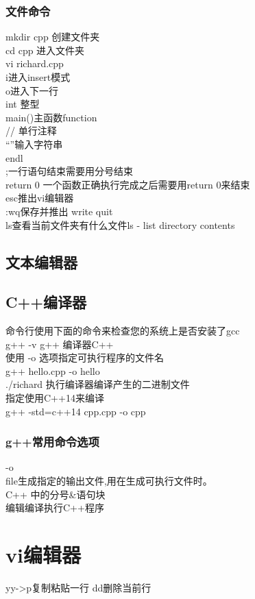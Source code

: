 \documentclass[12pt,twiside,a4paper]{ctexbook}
\numberwithin{chapter}{part}
\begin{document}
\subsection{文件命令}
mkdir cpp 创建文件夹\\
cd cpp 进入文件夹\\
vi richard.cpp\\
i进入insert模式\\
o进入下一行\\
int 整型\\
main()主函数function\\
// 单行注释\\
“”输入字符串\\
endl\\
;一行语句结束需要用分号结束\\
return 0 一个函数正确执行完成之后需要用return 0来结束\\
esc推出vi编辑器\\
:wq保存并推出 write quit\\
ls查看当前文件夹有什么文件ls - list directory contents

\section{文本编辑器}

\section{C++编译器}
命令行使用下面的命令来检查您的系统上是否安装了gcc\\
g++ -v
g++ 编译器C++\\
使用 -o 选项指定可执行程序的文件名\\
g++ hello.cpp -o hello\\
./richard 执行编译器编译产生的二进制文件\\
指定使用C++14来编译\\
g++ -std=c++14 cpp.cpp -o cpp 

\subsection{g++常用命令选项}
-o\\
file生成指定的输出文件,用在生成可执行文件时。\\
C++ 中的分号\&语句块\\
编辑编译执行C++程序

\chapter{vi编辑器}
yy->p复制粘贴一行
dd删除当前行
\end{document}

